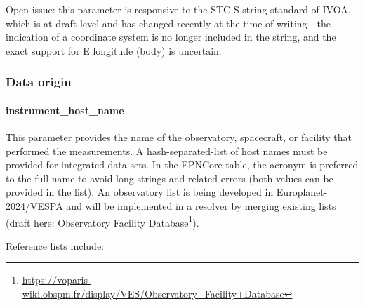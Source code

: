 \documentclass[11pt,a4paper]{ivoa}
\begin{document}
Open issue: this parameter is responsive to the STC-S string standard of IVOA, which is at draft level and has changed recently at the time of writing - the indication of a coordinate system is no longer included in the string, and the exact support for E longitude (body) is uncertain.

\subsubsection{Data origin}

\paragraph{instrument\_host\_name}

This parameter provides the name of the observatory, spacecraft, or facility that performed the measurements. A hash-separated-list of host names must be provided for integrated data sets. In the EPNCore table, the acronym is preferred to the full name to avoid long strings and related errors (both values can be provided in the list). An observatory list is being developed in Europlanet-2024/VESPA and will be implemented in a resolver by merging existing lists (draft here: Observatory Facility Database\footnote{\url{https://voparis-wiki.obspm.fr/display/VES/Observatory+Facility+Database}}).

Reference lists include:
\end{document}

